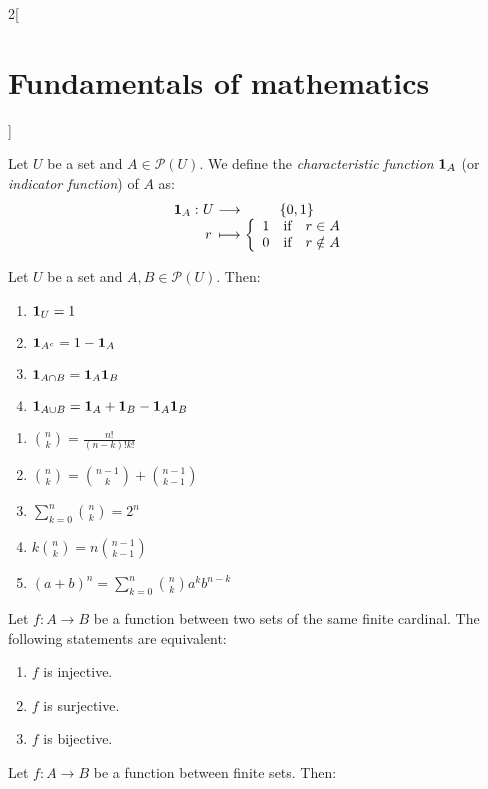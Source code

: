 \documentclass[../../../main.tex]{subfiles}
\begin{document}
\begin{multicols}{2}[\section{Fundamentals of mathematics}]
  \begin{definition}
    Let $U$ be a set and $A\in\mathcal{P}(U)$. We define the \emph{characteristic function} $\boldsymbol{\mathrm{1}}_A$ (or \emph{indicator function}) of $A$ as:
    $$
      \function{\vf{1}_A}{U}{\{0,1\}}{r}{\left\{
        \begin{array}{rcl}
          1 & \text{if} & r\in A    \\
          0 & \text{if} & r\notin A
        \end{array}\right.}
    $$
  \end{definition}
  \begin{proposition}
    Let $U$ be a set and $A,B\in\mathcal{P}(U)$. Then:
    \begin{enumerate}
      \item $\boldsymbol{\mathrm{1}}_U=1$
      \item $\boldsymbol{\mathrm{1}}_{A^c}=1-\boldsymbol{\mathrm{1}}_A$
      \item $\boldsymbol{\mathrm{1}}_{A\cap B}=\boldsymbol{\mathrm{1}}_A\boldsymbol{\mathrm{1}}_B$
      \item $\boldsymbol{\mathrm{1}}_{A\cup B}=\boldsymbol{\mathrm{1}}_A+\boldsymbol{\mathrm{1}}_B-\boldsymbol{\mathrm{1}}_A\boldsymbol{\mathrm{1}}_B$
    \end{enumerate}
  \end{proposition}
  \begin{proposition}\hfill
    \begin{enumerate}
      \item $\binom{n}{k}=\frac{n!}{(n-k)!k!}$
      \item $\binom{n}{k}=\binom{n-1}{k}+\binom{n-1}{k-1}$
      \item $\sum_{k=0}^n\binom{n}{k}=2^n$
      \item $k\binom{n}{k}=n\binom{n-1}{k-1}$
      \item $(a+b)^n=\sum_{k=0}^n\binom{n}{k}a^kb^{n-k}$
    \end{enumerate}
  \end{proposition}
  \begin{proposition}
    Let $f:A\rightarrow B$ be a function between two sets of the same finite cardinal. The following statements are equivalent:
    \begin{enumerate}
      \item $f$ is injective.
      \item $f$ is surjective.
      \item $f$ is bijective.
    \end{enumerate}
  \end{proposition}
  \begin{corollary}
    Let $f:A\rightarrow B$ be a function between finite sets. Then:

\end{corollary}
\end{multicols}
\end{document}

